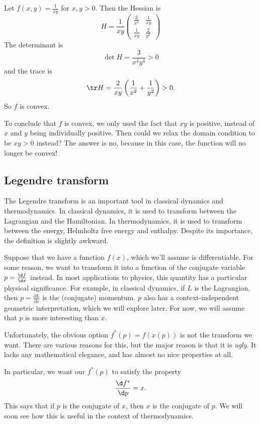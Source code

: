\documentclass[a4paper]{article}
\begin{document}
\begin{eg}
  Let $f(x, y) = \frac{1}{xy}$ for $x, y > 0$. Then the Hessian is
  \[
    H = \frac{1}{xy}
    \begin{pmatrix}
      \frac{2}{x^2} & \frac{1}{xy}\\
      \frac{1}{xy} & \frac{2}{y^2}
    \end{pmatrix}
  \]
  The determinant is
  \[
    \det H = \frac{3}{x^4y^4} > 0
  \]
  and the trace is
  \[
    \tr H = \frac{2}{xy}\left(\frac{1}{x^2} + \frac{1}{y^2}\right) > 0.
  \]
  So $f$ is convex.

  To conclude that $f$ is convex, we only used the fact that $xy$ is positive, instead of $x$ and $y$ being individually positive. Then could we relax the domain condition to be $xy > 0$ instead? The answer is no, because in this case, the function will no longer be convex!
\end{eg}

\subsection{Legendre transform}
The Legendre transform is an important tool in classical dynamics and thermodynamics. In classical dynamics, it is used to transform between the Lagrangian and the Hamiltonian. In thermodynamics, it is used to transform between the energy, Helmholtz free energy and enthalpy. Despite its importance, the definition is slightly awkward.

Suppose that we have a function $f(x)$, which we'll assume is differentiable. For some reason, we want to transform it into a function of the conjugate variable $p = \frac{\d f}{\d x}$ instead. In most applications to physics, this quantity has a particular physical significance. For example, in classical dynamics, if $L$ is the Lagrangian, then $p = \frac{\partial L}{\partial \dot{x}}$ is the (conjugate) momentum. $p$ also has a context-independent geometric interpretation, which we will explore later. For now, we will assume that $p$ is more interesting than $x$.

Unfortunately, the obvious option $f^*(p) = f(x(p))$ is not the transform we want. There are various reasons for this, but the major reason is that it is \emph{ugly}. It lacks any mathematical elegance, and has almost no nice properties at all.

In particular, we want our $f^*(p)$ to satisfy the property
\[
  \frac{\d f^*}{\d p} = x.
\]
This says that if $p$ is the conjugate of $x$, then $x$ is the conjugate of $p$. We will soon see how this is useful in the context of thermodynamics.
\end{document}
